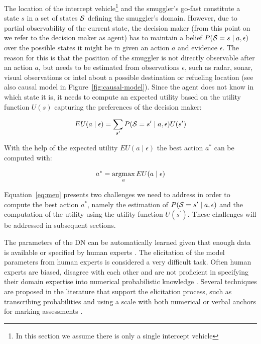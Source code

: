 \documentclass[conference]{IEEEtran}
\begin{document}
The location of the intercept vehicle\footnote{In this section we assume there is only a single intercept vehicle} and the smuggler's go-fast constitute a state $s$ in a set of states $\S$ defining the smuggler's domain. However, due to partial observability of the current state, the decision maker (from this point on we refer to the decision maker as  agent) has to maintain a belief $P(\S = s \mid  a, \epsilon)$ over the possible states it might be in given an action $a$ and evidence $\epsilon$. The reason for this is that the position of the smuggler is not directly observable after an action $a$, but needs to be estimated from observations $\epsilon$, such as radar, sonar, visual observations or intel about a possible destination or refueling location (see also causal model in Figure~\ref{fig:causal-model}). Since the agent does not know in which state it is, it needs to compute an expected utility based on the utility function $U(s)$ capturing the preferences of the decision maker:

\begin{eqnarray}
 EU(a\mid\epsilon) = \sum_{s^\prime}P(\S = s^\prime\mid a, \epsilon)U(s^\prime)
\end{eqnarray}

With the help of the expected utility $EU(a\mid\epsilon)$ the best action $a^*$ can be computed with:

\begin{eqnarray}\label{eq:meu}
 a^* = \argmax_a EU(a\mid \epsilon)
\end{eqnarray}

Equation~\ref{eq:meu} presents two challenges we need to address in order to compute the best action $a^*$, namely the estimation of $P(\S = s^\prime\mid a, \epsilon)$ and the computation of the utility using the utility function $U(s^\prime)$. These challenges will be addressed in subsequent sections.


The parameters of the DN can be automatically learned \cite{cooper92ml} given that enough data is available or specified by human experts \cite{jensen01book,gaag99uai}. The elicitation of the model parameters from human experts is considered a very difficult task. Often human experts are biased, disagree with each other and are not proficient in specifying their domain expertise into numerical probabilistic knowledge \cite{gigerenzer03}. Several techniques are proposed in the literature that support the elicitation process, such as transcribing probabilities and using a scale with both numerical or verbal anchors for marking assessments \cite{gaag99uai,kruger08}.
\end{document}
